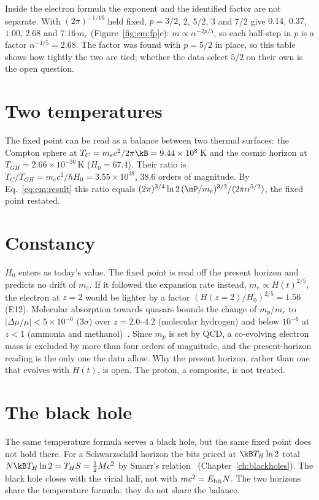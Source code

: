 Inside the electron formula the exponent and the identified factor are not separate. With $(2\pi)^{-1/10}$ held fixed, $p=3/2$, 2, 5/2, 3 and
7/2 give $0.14$, $0.37$, $1.00$, $2.68$ and $7.16\,m_e$ (Figure~\ref{fig:em:fp}c): $m\propto\alpha^{-2p/5}$, so each half-step in $p$ is a factor
$\alpha^{-1/5}=2.68$. \calc{} The factor was found with $p=5/2$ in place, so this table shows how tightly the two are tied; whether the data select $5/2$ on their own is the open question.

\section{Two temperatures}\label{sec:em:temps}
The fixed point can be read as a balance between two thermal surfaces: the Compton sphere at $T_C=m_ec^2/2\pi\kB=9.44\times10^8$\,K and the cosmic
horizon at $T_{GH}=2.66\times10^{-30}$\,K ($H_0=67.4$). Their ratio is $T_C/T_{GH}=m_ec^2/\hbar H_0=3.55\times10^{38}$, 38.6 orders of magnitude. \calc{} By
Eq.~\eqref{eq:em:result} this ratio equals $(2\pi)^{3/4}\ln2\,(\mP/m_e)^{3/2}/(2\pi\alpha^{5/2})$, the fixed point restated.

\section{Constancy}\label{sec:em:constancy}
$H_0$ enters as today's value. The fixed point is read off the present horizon and predicts no drift of $m_e$. If it followed the expansion
rate instead, $m_e\propto H(t)^{2/5}$, the electron at $z=2$ would be lighter by a factor $(H(z{=}2)/H_0)^{2/5}=1.56$ (E12). \calc{} Molecular
absorption towards quasars bounds the change of $m_p/m_e$ to $|\Delta\mu/\mu|<5\times10^{-6}$ ($3\sigma$) over $z=2.0$--$4.2$ (molecular hydrogen) and below $10^{-6}$ at $z<1$ (ammonia and methanol)~\cite{Ubachs2016}.
\observed{} Since $m_p$ is set by QCD, a co-evolving electron mass is excluded by more than four orders of magnitude, and the present-horizon reading
is the only one the data allow. Why the present horizon, rather than one that evolves with $H(t)$, is open. The proton, a composite, is not
treated. \openprob

\section{The black hole}\label{sec:em:bh}
The same temperature formula serves a black hole, but the same fixed point does not hold there. For a Schwarzschild horizon the bits priced at
$\kB T_H\ln2$ total $N\kB T_H\ln2=T_HS=\tfrac12Mc^2$ by Smarr's relation~\cite{Smarr1973} (Chapter~\ref{ch:blackholes}). \derived{} The black hole
closes with the virial half, not with $mc^2=E_{\rm bit}N$. The two horizons share the temperature formula; they do not share the balance.

